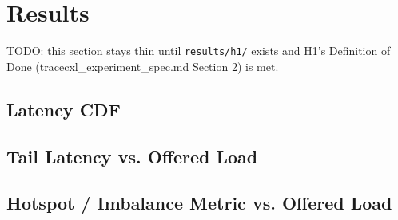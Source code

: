 %

\section{Results}
\label{sec:results}

TODO: this section stays thin until \texttt{results/h1/} exists and H1's
Definition of Done (tracecxl\_experiment\_spec.md Section 2) is met.

\subsection{Latency CDF}

\subsection{Tail Latency vs. Offered Load}

\subsection{Hotspot / Imbalance Metric vs. Offered Load}
